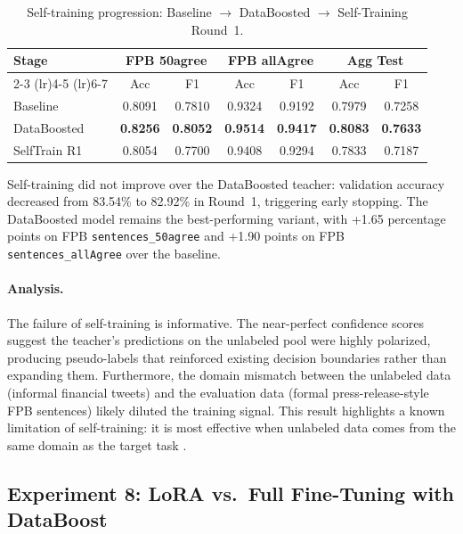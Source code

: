 \documentclass[11pt]{article}
\begin{document}
\begin{table}[h]
\centering
\caption{Self-training progression: Baseline $\to$ DataBoosted $\to$ Self-Training Round~1.}
\label{tab:self-training}
\begin{tabular}{lcccccc}
\toprule
\textbf{Stage} & \multicolumn{2}{c}{\textbf{FPB 50agree}} & \multicolumn{2}{c}{\textbf{FPB allAgree}} & \multicolumn{2}{c}{\textbf{Agg Test}} \\
\cmidrule(lr){2-3} \cmidrule(lr){4-5} \cmidrule(lr){6-7}
& Acc & F1 & Acc & F1 & Acc & F1 \\
\midrule
Baseline & 0.8091 & 0.7810 & 0.9324 & 0.9192 & 0.7979 & 0.7258 \\
DataBoosted & \textbf{0.8256} & \textbf{0.8052} & \textbf{0.9514} & \textbf{0.9417} & \textbf{0.8083} & \textbf{0.7633} \\
SelfTrain R1 & 0.8054 & 0.7700 & 0.9408 & 0.9294 & 0.7833 & 0.7187 \\
\bottomrule
\end{tabular}
\end{table}

Self-training did not improve over the DataBoosted teacher: validation accuracy decreased from 83.54\% to 82.92\% in Round~1, triggering early stopping. The DataBoosted model remains the best-performing variant, with +1.65 percentage points on FPB \texttt{sentences\_50agree} and +1.90 points on FPB \texttt{sentences\_allAgree} over the baseline.

\paragraph{Analysis.}
The failure of self-training is informative. The near-perfect confidence scores suggest the teacher's predictions on the unlabeled pool were highly polarized, producing pseudo-labels that reinforced existing decision boundaries rather than expanding them. Furthermore, the domain mismatch between the unlabeled data (informal financial tweets) and the evaluation data (formal press-release-style FPB sentences) likely diluted the training signal. This result highlights a known limitation of self-training: it is most effective when unlabeled data comes from the same domain as the target task \citep{xie2020self}.

\subsection{Experiment 8: LoRA vs.\ Full Fine-Tuning with DataBoost}
\label{sec:lora-vs-full}
\end{document}
